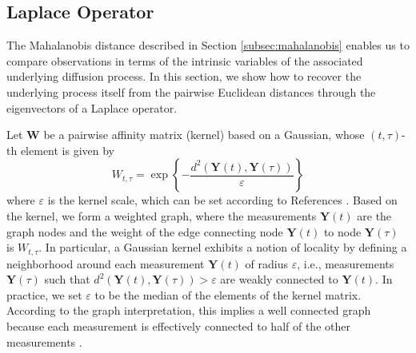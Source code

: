 \documentclass[aip,jcp,preprint]{revtex4-1}
\begin{document}
\subsection{Laplace Operator}
The Mahalanobis distance described in Section \ref{subsec:mahalanobis} enables us to compare observations in terms of the intrinsic variables of the associated underlying diffusion process.
%
In this section, we show how to recover the underlying process itself from the pairwise Euclidean distances through the eigenvectors of a Laplace operator.

Let $\mathbf{W}$ be a pairwise affinity matrix (kernel) based on a Gaussian, whose $(t,\tau)$-th element is given by
\begin{equation}
	W_{t,\tau} = \exp \left\{ - \frac{ d^2(\mathbf{Y}(t), \mathbf{Y}(\tau) )} {\varepsilon}\right\}
	\label{eq:kernel}
\end{equation}
where $\varepsilon$ is the kernel scale, which can be set according to References .
%
Based on the kernel, we form a weighted graph, where the measurements $\mathbf{Y}(t)$ are the graph nodes and the weight of the edge connecting node $\mathbf{Y}(t)$ to node $\mathbf{Y}(\tau)$ is $W_{t,\tau}$.
%
In particular, a Gaussian kernel exhibits a notion of locality by defining a neighborhood around each measurement $\mathbf{Y}(t)$ of radius $\varepsilon$,
i.e., measurements $\mathbf{Y}(\tau)$ such that $d^2(\mathbf{Y}(t), \mathbf{Y}(\tau) ) > \varepsilon$ are weakly connected to $\mathbf{Y}(t)$.
%
In practice, we set $\varepsilon$ to be the median of the elements of the kernel matrix.
%
According to the graph interpretation, this implies a well connected graph because each measurement is effectively connected to half of the other measurements \cite{rohrdanz2011determination}.
\end{document}
